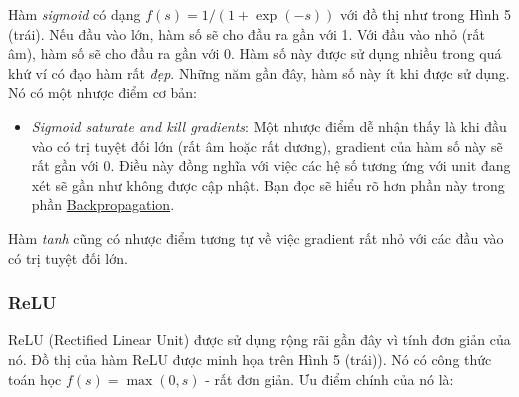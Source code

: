  
Hàm \textit{sigmoid} có dạng $f(s) = 1/(1 + \exp(-s))$ với đồ thị như trong Hình 5 (trái). Nếu đầu vào lớn, hàm số sẽ cho đầu ra gần với 1. Với đầu vào nhỏ (rất âm), hàm số sẽ cho đầu ra gần với 0. Hàm số này được sử dụng nhiều trong quá khứ ví có đạo hàm rất \textit{đẹp}. Những năm gần đây, hàm số này ít khi được sử dụng. Nó có một nhược điểm cơ bản: 

\begin{itemize}
    \item \textit{Sigmoid saturate and kill gradients}: Một nhược điểm dễ nhận thấy là khi đầu vào có trị tuyệt đối lớn (rất âm hoặc rất dương), gradient của hàm số này sẽ rất gần với 0. Điều này đồng nghĩa với việc các hệ số tương ứng với unit đang xét sẽ gần như không được cập nhật. Bạn đọc sẽ hiểu rõ hơn phần này trong phần \href{http://machinelearningcoban.com#-backpropagation}{Backpropagation}. 
 
\end{itemize}
Hàm \textit{tanh} cũng có nhược điểm tương tự về việc gradient rất nhỏ với các đầu vào có trị tuyệt đối lớn. 
 
 
\subsubsection{ReLU}
 
 
ReLU (Rectified Linear Unit) được sử dụng rộng rãi gần đây vì tính đơn giản của nó. Đồ thị của hàm ReLU được minh họa trên Hình 5 (trái)). Nó có công thức toán học $f(s) = \max(0, s)$ - rất đơn giản. Ưu điểm chính của nó là: 

